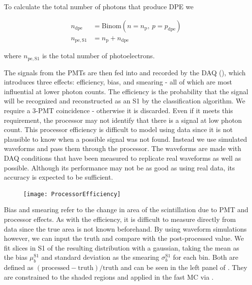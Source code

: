To calculate the total number of photons that produce DPE we

\begin{equation}
\begin{aligned}
n_{\mathrm{dpe}} &= \mathrm{Binom} (n = n_{\mathrm{p}},\ p = p_{\mathrm{dpe}} ) \\
n_{\mathrm{pe,S1}} &= n_{\mathrm{p}} + n_{\mathrm{dpe}}
\end{aligned}
\end{equation}

\noindent where $n_{\mathrm{pe,S1}}$ is the total number of photoelectrons.

The signals from the PMTs are then fed into and recorded by the DAQ (), which introduces three effects:
efficiency, bias, and smearing - all of which are most influential at lower photon counts.  The efficiency is the probability that the
signal will be recognized and reconstructed as an S1 by the
classification algorithm.  We require a 3-PMT coincidence - otherwise it is discarded.  Even if it meets this requirement, the processor
may not identify that there is a signal at low photon count.  This processor efficiency is difficult to model using data since it is
not plausible to know when a possible signal was not found.  Instead we use simulated waveforms and pass them through the processor.  The
waveforms are made with DAQ conditions that have been measured to replicate real waveforms as well as possible.  Although its performance
may not be as good as using real data, its accuracy is expected to be sufficient.

\begin{figure}
\centering
\texttt{[image: ProcessorEfficiency]}
\label{fig:er_nr_calibrations_parameter_determ_det_phys_proc_eff}
\end{figure}

Bias and smearing refer to the change in area of the scintillation due to PMT and processor effects.  As with the efficiency, it is
difficult to measure directly from data since the true area is not known beforehand.  By using waveform simulations however, we can input
the truth and compare with the post-processed value.  We fit slices in S1 of the resulting distribution with a gaussian, taking the mean
as the bias $\mu_{b}^{\mathrm{S1}}$ and standard deviation as the smearing $\sigma_{b}^{\mathrm{S1}}$ for each bin.  Both are defined
as $(\mathrm{processed} - \mathrm{truth}) / \mathrm{truth}$ and can be seen in the left panel of
.  They are constrained to the shaded regions and applied in
the fast MC via .

